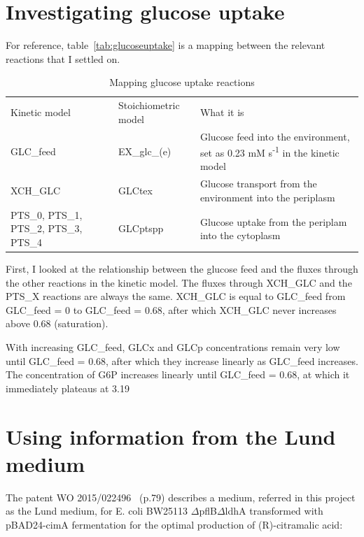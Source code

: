 \documentclass[parskip=full]{scrreprt}
\begin{document}
\section{Investigating glucose uptake}
\label{sec:glucoseuptake}

For reference, table~\vref{tab:glucoseuptake} is a mapping between the relevant reactions that I settled on.

\begin{table}
  \caption{Mapping glucose uptake reactions}
  \label{tab:glucoseuptake}
  \centering
  \begin{tabularx}{\linewidth}{LLL}
    Kinetic model & Stoichiometric model & What it is\\
    GLC\_feed & EX\_glc\_(e) & Glucose feed into the environment, set as 0.23 mM s\textsuperscript{-1} in the kinetic model\\
    XCH\_GLC & GLCtex & Glucose transport from the environment into the periplasm\\
    PTS\_0, PTS\_1, PTS\_2, PTS\_3, PTS\_4 & GLCptspp & Glucose uptake from the periplam into the cytoplasm\\
  \end{tabularx}
\end{table}

First, I looked at the relationship between the glucose feed and the fluxes through the other reactions in the kinetic model. The fluxes through XCH\_GLC and the PTS\_X reactions are always the same. XCH\_GLC is equal to GLC\_feed from GLC\_feed = 0 to GLC\_feed = 0.68, after which XCH\_GLC never increases above 0.68 (saturation).

With increasing GLC\_feed, GLCx and GLCp concentrations remain very low until GLC\_feed = 0.68, after which they increase linearly as GLC\_feed increases. The concentration of G6P increases linearly until GLC\_feed = 0.68, at which it immediately plateaus at 3.19

\section{Using information from the Lund medium}
\label{sec:lund}

The patent WO 2015/022496~\cite{eastham_process_2015} (p.79) describes a medium, referred in this project as the Lund medium, for E. coli BW25113 $\Delta$pflB$\Delta$ldhA transformed with pBAD24-cimA fermentation for the optimal production of (R)-citramalic acid:
\end{document}
